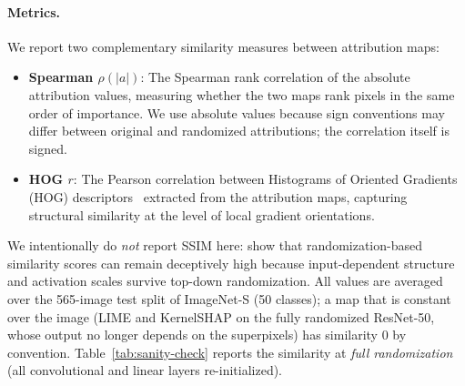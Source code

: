 \documentclass[twoside]{article}
\newcommand{\1}{\mathbf{1}}
\begin{document}
\paragraph{Metrics.}
We report two complementary similarity measures between attribution maps:
\begin{itemize}
    \item \textbf{Spearman $\rho(|a|)$}: The Spearman rank correlation of the absolute attribution values,
        measuring whether the two maps rank pixels in the same order of importance. We use absolute values
        because sign conventions may differ between original and randomized attributions; the correlation
        itself is signed.
    \item \textbf{HOG $r$}: The Pearson correlation between Histograms of Oriented Gradients (HOG)
        descriptors~\citep{Dalal2005hog} extracted from the attribution maps, capturing structural
        similarity at the level of local gradient orientations.
\end{itemize}
We intentionally do \emph{not} report SSIM here: \citet{Binder2022shortcomings} show that
randomization-based similarity scores can remain deceptively high because input-dependent structure
and activation scales survive top-down randomization.
All values are averaged over the 565-image test split of ImageNet-S (50 classes); a map that is
constant over the image (LIME and KernelSHAP on the fully randomized ResNet-50, whose output no
longer depends on the superpixels) has similarity $0$ by convention. Table~\ref{tab:sanity-check}
reports the similarity at \emph{full randomization} (all convolutional and linear layers
re-initialized).
\end{document}
